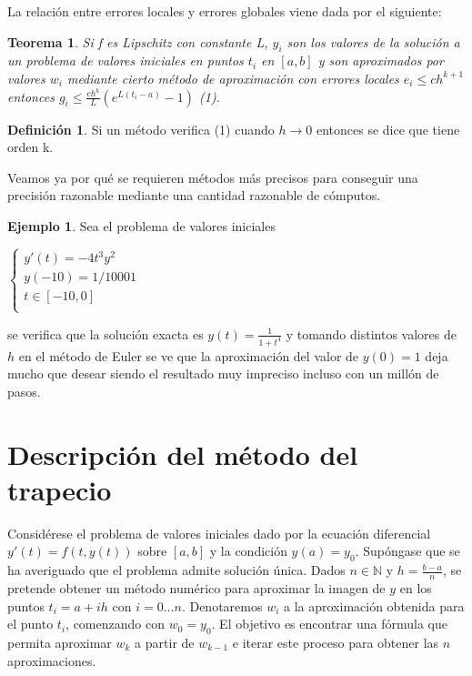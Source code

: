 \documentclass{article}
\theoremstyle{theorem-style}  %
\newtheorem{theorem}{Teorema}[section]  %
\theoremstyle{definition}
\newtheorem{definition}{Definición}[section]
\theoremstyle{example-style}
\newtheorem{example}{Ejemplo}[section]
\begin{document}
La relación entre errores locales y errores globales viene dada por el siguiente:

\begin{theorem}
Si f es Lipschitz con constante L, $y_i$ son los valores de la solución a un problema de valores iniciales en puntos $t_i$ en $[a,b]$ y son aproximados por valores $w_i$ mediante cierto método de aproximación con errores locales $e_i \leq c h^{k+1}$ entonces $g_i \le \frac{c h^k}{L} (e^{L(t_i-a)}-1)$ (1).
\end{theorem}

\begin{definition} Si un método verifica (1) cuando $h \to 0$ entonces se dice que tiene orden k.
\end{definition}

Veamos ya por qué se requieren métodos más precisos para conseguir una precisión razonable mediante una cantidad razonable de cómputos.

\begin{example} Sea el problema de valores iniciales
\begin{center}
$\begin{cases}
y'(t) = -4 t^3 y^2 \\
y(-10) = 1/10001 \\
t \in [-10,0] \\
\end{cases}$
\end{center}
se verifica que la solución exacta es $y(t)=\frac{1}{1+t^4}$ y tomando distintos valores de $h$ en el método de Euler se ve que la aproximación del valor de $y(0)=1$ deja mucho que desear siendo el resultado muy impreciso incluso con un millón de pasos. 
\end{example}


\section{Descripción del método del trapecio}

	Considérese el problema de valores iniciales dado por la ecuación diferencial $y'(t) = f(t,y(t))$ sobre $[a,b]$ y la condición $y(a) = y_0$. Supóngase que se ha averiguado que el problema admite solución única. Dados $n \in \mathbb{N}$ y $h = \frac{b-a}{n}$, se pretende obtener un método numérico para aproximar la imagen de $y$ en los puntos $t_i = a + ih$ con $i = 0 \ldots n$. Denotaremos $w_i$ a la aproximación obtenida para el punto $t_i$, comenzando con $w_0 = y_0$. El objetivo es encontrar una fórmula que permita aproximar $w_k$ a partir de $w_{k-1}$ e iterar este proceso para obtener las $n$ aproximaciones.
	
\end{document}
